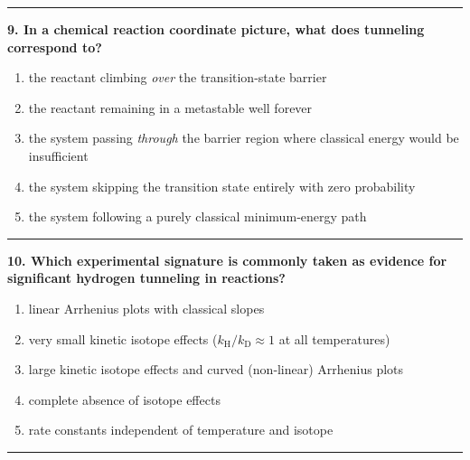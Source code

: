 \documentclass[
  english,
  9pt,
]{extbook}
\providecommand{\tightlist}{%
  \setlength{\itemsep}{0pt}\setlength{\parskip}{0pt}}
\theoremstyle{definition}
\theoremstyle{definition}
\theoremstyle{definition}
\theoremstyle{definition}
\theoremstyle{remark}
\begin{document}
\begin{center}\rule{0.5\linewidth}{0.5pt}\end{center}

\textbf{9. In a chemical reaction coordinate picture, what does tunneling correspond to?}

\begin{enumerate}
\def\labelenumi{\alph{enumi}.}
\tightlist
\item
  the reactant climbing \emph{over} the transition-state barrier\\
\item
  the reactant remaining in a metastable well forever\\
\item
  the system passing \emph{through} the barrier region where classical energy would be insufficient\\
\item
  the system skipping the transition state entirely with zero probability\\
\item
  the system following a purely classical minimum‑energy path
\end{enumerate}

\begin{center}\rule{0.5\linewidth}{0.5pt}\end{center}

\textbf{10. Which experimental signature is commonly taken as evidence for significant hydrogen tunneling in reactions?}

\begin{enumerate}
\def\labelenumi{\alph{enumi}.}
\tightlist
\item
  linear Arrhenius plots with classical slopes\\
\item
  very small kinetic isotope effects (\(k_\text{H}/k_\text{D} \approx 1\) at all temperatures)\\
\item
  large kinetic isotope effects and curved (non‑linear) Arrhenius plots\\
\item
  complete absence of isotope effects\\
\item
  rate constants independent of temperature and isotope
\end{enumerate}

\begin{center}\rule{0.5\linewidth}{0.5pt}\end{center}
\end{document}
